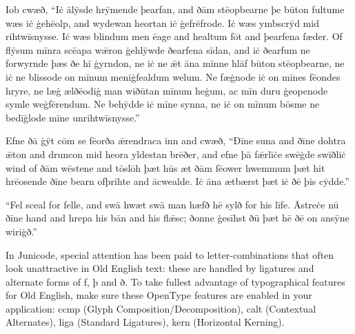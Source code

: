 \documentclass[letterpaper]{article}
\begin{document}
Iob cwæð, “Iċ ālȳsde hrȳmende þearfan, and ðām stēopbearne þe būton fultume wæs iċ ġehēolp, and wydewan heort\-an iċ ġefrēfrode.  Iċ wæs ymbscrȳd mid rihtwīsnysse.  Iċ wæs blind\-um men ēage and healtum fōt and þearfena fæder.  Of flȳsum mīnra scēapa wǣron ġehlȳwde ðearfena sīdan, and iċ ðearfum ne forwyrnde þæs ðe hī ġyrndon, ne iċ ne ǣt āna mīnne hlāf būton stēopbearne, ne iċ ne blissode on mīnum meniġfealdum welum.  Ne fæġnode iċ on mīnes fēondes hryre, ne læġ ælðēodiġ man wiðūtan mīnum heġum, ac mīn duru ġeopenode symle weġ\-fēr\-end\-um.  Ne behȳdde iċ mīne synna, ne iċ on mīnum bōsme ne bedīġlode mīne unrihtwīsnysse.”

Efne ðā ġȳt cōm se fēorða ǣrendraca inn and cwæð, “Ðīne suna and ðīne dohtra ǣton and druncon mid heora yldestan brēðer, and efne þā fǣrlīċe swēġde swīðliċ wind of ðām wēst\-ene and tōslōh þæt hūs æt ðām fēower hwemmum þæt hit hrēosende ðīne bearn ofþrihte and ācwealde. Iċ āna ætbærst þæt iċ ðē þis cȳdde.”

“Fel sceal for felle, and swā hwæt swā man hæfð hē sylð for his līfe.  Āstreċe nū ðīne hand and hrepa his bān and his flǣsc; ðonne ġesīhst ðū þæt hē ðē on ansȳne wiriġð.”

\pagebreak

\upshape\mdseries\small\noindent In Junicode, special attention has been paid to letter-combinations that often look
unattractive in Old English text: these are handled by ligatures and alternate forms of f, þ and ð.
To take fullest advantage of typographical features for Old English, make sure these OpenType
features are enabled in your application: ccmp (Glyph Composition/Decomposition), calt
(Contextual Alternates), liga (Standard Ligatures), kern (Horizontal Kerning).
\end{document}
